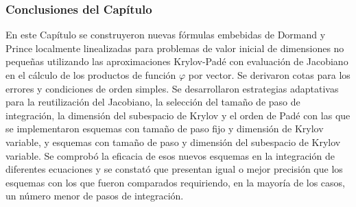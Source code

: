 \subsubsection{Conclusiones del Capítulo}
En este Capítulo se construyeron nuevas fórmulas embebidas de Dormand y Prince localmente linealizadas para problemas de valor inicial de dimensiones no pequeñas utilizando las aproximaciones Krylov-Padé
con evaluación de Jacobiano en el cálculo de los productos de función $\varphi$ por vector. Se derivaron cotas para los errores y condiciones de orden simples. Se desarrollaron estrategias adaptativas para la reutilización del Jacobiano, la selección del tamaño de paso de integración, la dimensión del subespacio de Krylov y el orden de Padé con las que se implementaron esquemas con tamaño de paso fijo y dimensión
de Krylov variable, y esquemas con tamaño de paso y dimensión del subespacio de Krylov variable. Se comprobó la eficacia de esos nuevos esquemas en la integración de diferentes ecuaciones y se constató que presentan igual o mejor precisión que los esquemas con los que fueron comparados requiriendo, en la mayoría de los casos, un número menor de pasos de integración.

%
%
